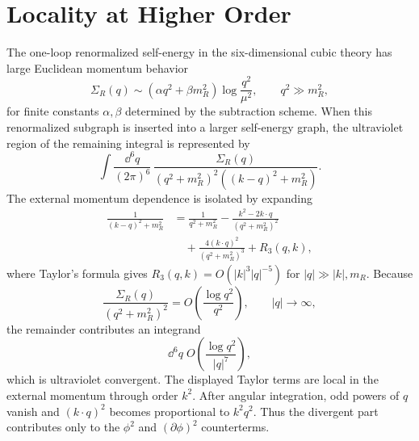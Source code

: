 \section{Locality at Higher Order}

The one-loop renormalized self-energy in the six-dimensional cubic theory has
large Euclidean momentum behavior
\[
  \Sigma_R(q)
  \sim
  (\alpha q^2+\beta m_R^2)\log\frac{q^2}{\mu^2},
  \qquad
  q^2\gg m_R^2,
\]
for finite constants \(\alpha,\beta\) determined by the subtraction scheme.
When this renormalized subgraph is inserted into a larger self-energy graph,
the ultraviolet region of the remaining integral is represented by
\[
  \int
  \frac{\dd^6q}{(2\pi)^6}\,
  \frac{\Sigma_R(q)}
       {(q^2+m_R^2)^2((k-q)^2+m_R^2)} .
\]
The external momentum dependence is isolated by expanding
\[
\begin{aligned}
  \frac1{(k-q)^2+m_R^2}
  &=
  \frac1{q^2+m_R^2}
  -
  \frac{k^2-2k\cdot q}{(q^2+m_R^2)^2}       \\
  &\quad
  +
  \frac{4(k\cdot q)^2}{(q^2+m_R^2)^3}
  +
  R_3(q,k),
\end{aligned}
\]
where Taylor's formula gives \(R_3(q,k)=O(|k|^3|q|^{-5})\) for \(|q|\gg |k|,m_R\).
Because
\[
  \frac{\Sigma_R(q)}{(q^2+m_R^2)^2}
  =
  O\!\left(\frac{\log q^2}{q^2}\right),
  \qquad |q|\to\infty,
\]
the remainder contributes an integrand
\[
  \dd^6q\;O\!\left(\frac{\log q^2}{|q|^7}\right),
\]
which is ultraviolet convergent.  The displayed Taylor terms are local in the
external momentum through order \(k^2\).  After angular integration, odd powers
of \(q\) vanish and
\((k\cdot q)^2\) becomes proportional to \(k^2q^2\).  Thus the divergent part
contributes only to the \(\phi^2\) and \((\partial\phi)^2\) counterterms.

